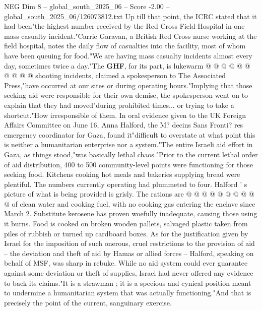 \begin{textsample}{NEG Dim 8 – global\_south\_2025\_06 – Score -2.00 – global\_south\_2025\_06/126073812.txt}
Up till that point, the ICRC stated that it had been"the highest number received by the Red Cross Field Hospital in one mass casualty incident."Carrie Garavan, a British Red Cross nurse working at the field hospital, notes the daily flow of casualties into the facility, most of whom have been queuing for food."We are having mass casualty incidents almost every day, sometimes twice a day."The \textbf{GHF}, for its part, is lukewarm @ @ @ @ @ @ @ @ @ @ shooting incidents, claimed a spokesperson to The Associated Press,"have occurred at our sites or during operating hours."Implying that those seeking aid were responsible for their own demise, the spokesperson went on to explain that they had moved"during prohibited times... or trying to take a shortcut."How irresponsible of them.
In oral evidence given to the UK Foreign Affairs Committee on June 16, Anna Halford, the M? decins Sans Fronti? res emergency coordinator for Gaza, found it"difficult to overstate at what point this is neither a humanitarian enterprise nor a system."The entire Israeli aid effort in Gaza, as things stood,"was basically lethal chaos."Prior to the current lethal order of aid distribution, 400 to 500 community-level points were functioning for those seeking food.
Kitchens cooking hot meals and bakeries supplying bread were plentiful.
The numbers currently operating had plummeted to four.
Halford ' s picture of what is being provided is grisly.
The rations are @ @ @ @ @ @ @ @ @ @ of clean water and cooking fuel, with no cooking gas entering the enclave since March 2.
Substitute kerosene has proven woefully inadequate, causing those using it burns.
Food is cooked on broken wooden pallets, salvaged plastic taken from piles of rubbish or turned up cardboard boxes.
As for the justification given by Israel for the imposition of such onerous, cruel restrictions to the provision of aid -- the deviation and theft of aid by Hamas or allied forces -- Halford, speaking on behalf of MSF, was sharp in rebuke.
While no aid system could ever guarantee against some deviation or theft of supplies, Israel had never offered any evidence to back its claims."It is a strawman ; it is a specious and cynical position meant to undermine a humanitarian system that was actually functioning."And that is precisely the point of the current, sanguinary exercise.

\end{textsample}
